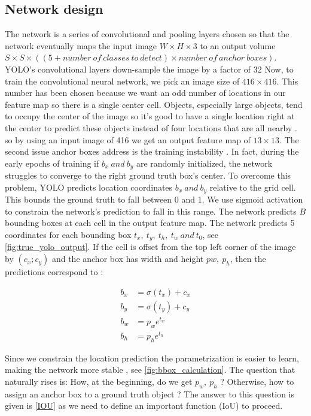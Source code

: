 \subsection{Network design}\label{sub:net_design}\label{sec:network}

The network is a series of convolutional and pooling layers chosen so that the network eventually maps the input image $W \times H \times 3$ to
an output volume $S \times S \times ((5 + number\ of\ classes\ to\ detect) \times number\ of\ anchor\ boxes)$. YOLO's convolutional layers down-sample the image by a factor of 32
Now, to train the convolutional neural network, we pick an image size of $416 \times 416$.
This number has been chosen because we want an odd number of
locations in our feature map so there is a single center cell.
Objects, especially large objects, tend to occupy the center
of the image so it’s good to have a single location right at
the center to predict these objects instead of four locations
that are all nearby \cite{YOLOv2}.
so by using an input image of 416 we get an output feature map of $13 \times 13$.
The second issue anchor boxes address is the training instability \cite{YOLOv2}. In fact, during the early epochs of training if $b_{x}\ and\ b_{y}$ are randomly initialized, the network
struggles to converge to the right ground truth box's center. To overcome this problem, YOLO predicts location coordinates $b_{x}\ and\ b_{y}$ relative to the grid
cell. This bounds the ground truth to fall between 0 and 1. We use sigmoid activation to constrain the network's prediction to fall in this range.
The network predicts $B$ bounding boxes at each cell in the output feature map. The network predicts 5 coordinates for each bounding box $t_{x},\ t_{y},\ t_{h},\ t_{w}\ and\ t_{0}$, see \cref{fig:true_yolo_output}. If the cell is
offset from the top left corner of the image by $(c_{x}; c_{y})$ and
the anchor box has width and height $p{w},\ p_{h}$, then
the predictions correspond to \cite{YOLOv2}:

\begin{align}
  \label{bbox}
  b_{x} &= \sigma(t_{x}) + c_x \\
  b_{y} &= \sigma(t_{y}) + c_y \\
  b_{w} &= p_{w}e^{t_{w}} \\
  b_{h} &= p_{h}e^{t_{h}}
\end{align}

Since we constrain the location prediction the
parametrization is easier to learn, making the network
more stable \cite{YOLOv2}, see \cref{fig:bbox_calculation}.
The question that naturally rises is: How, at the beginning, do we get $p_{w},\ p_{h}$ ? Otherwise, how to assign an anchor box to a ground truth object ?
The answer to this question is given is \cref{IOU} as we need to define an important function (IoU) to proceed.

